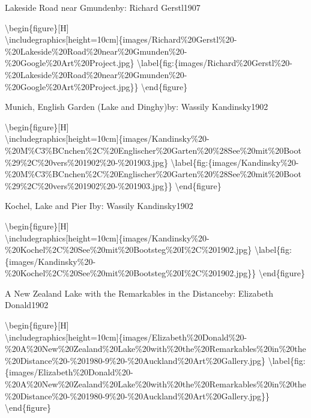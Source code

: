\documentclass[
  a4paper,
]{book}
\begin{document}
\label{http:ux2fux2fwww.wikidata.orgux2fentityux2fQ28798149}
Lakeside Road near Gmundenby: Richard Gerstl1907

\textbackslash begin\{figure\}{[}H{]}\\
\textbackslash includegraphics{[}height=10cm{]}\{images/Richard\%20Gerstl\%20-\%20Lakeside\%20Road\%20near\%20Gmunden\%20-\%20Google\%20Art\%20Project.jpg\}
\textbackslash label\{fig:\{images/Richard\%20Gerstl\%20-\%20Lakeside\%20Road\%20near\%20Gmunden\%20-\%20Google\%20Art\%20Project.jpg\}\}
\textbackslash end\{figure\}

\label{http:ux2fux2fwww.wikidata.orgux2fentityux2fQ18705414}
Munich, English Garden (Lake and Dinghy)by: Wassily Kandinsky1902

\textbackslash begin\{figure\}{[}H{]}\\
\textbackslash includegraphics{[}height=10cm{]}\{images/Kandinsky\%20-\%20M\%C3\%BCnchen\%2C\%20Englischer\%20Garten\%20\%28See\%20mit\%20Boot\%29\%2C\%20vers\%201902\%20-\%201903.jpg\}
\textbackslash label\{fig:\{images/Kandinsky\%20-\%20M\%C3\%BCnchen\%2C\%20Englischer\%20Garten\%20\%28See\%20mit\%20Boot\%29\%2C\%20vers\%201902\%20-\%201903.jpg\}\}
\textbackslash end\{figure\}

\label{http:ux2fux2fwww.wikidata.orgux2fentityux2fQ18705456}
Kochel, Lake and Pier Iby: Wassily Kandinsky1902

\textbackslash begin\{figure\}{[}H{]}\\
\textbackslash includegraphics{[}height=10cm{]}\{images/Kandinsky\%20-\%20Kochel\%2C\%20See\%20mit\%20Bootsteg\%20I\%2C\%201902.jpg\}
\textbackslash label\{fig:\{images/Kandinsky\%20-\%20Kochel\%2C\%20See\%20mit\%20Bootsteg\%20I\%2C\%201902.jpg\}\}
\textbackslash end\{figure\}

\label{http:ux2fux2fwww.wikidata.orgux2fentityux2fQ27876304}
A New Zealand Lake with the Remarkables in the Distanceby: Elizabeth
Donald1902

\textbackslash begin\{figure\}{[}H{]}\\
\textbackslash includegraphics{[}height=10cm{]}\{images/Elizabeth\%20Donald\%20-\%20A\%20New\%20Zealand\%20Lake\%20with\%20the\%20Remarkables\%20in\%20the\%20Distance\%20-\%201980-9\%20-\%20Auckland\%20Art\%20Gallery.jpg\}
\textbackslash label\{fig:\{images/Elizabeth\%20Donald\%20-\%20A\%20New\%20Zealand\%20Lake\%20with\%20the\%20Remarkables\%20in\%20the\%20Distance\%20-\%201980-9\%20-\%20Auckland\%20Art\%20Gallery.jpg\}\}
\textbackslash end\{figure\}
\end{document}
